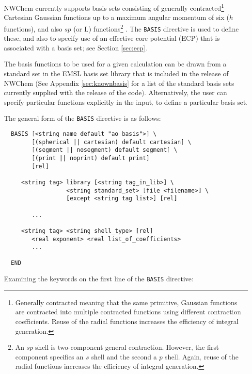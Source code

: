 %
%
\label{sec:basis} 

NWChem currently supports basis sets consisting of generally
contracted\footnote{Generally contracted meaning that the same
  primitive, Gaussian functions are contracted into multiple
  contracted functions using different contraction coefficients.
  Reuse of the radial functions increases the efficiency of integral
  generation.} Cartesian Gaussian functions up to a maximum angular
momentum of six ($h$ functions), and also $sp$ (or L)
functions\footnote{An $sp$ shell is two-component general contraction.
  However, the first component specifies an $s$ shell and the second a
  $p$ shell.  Again, reuse of the radial functions increases the efficiency
  of integral generation.} .  The {\tt BASIS} directive is used to
define these, and also to specify use of an effective core potential
(ECP) that is associated with a basis set; see Section \ref{sec:ecp}.

The basis functions to be used for a given calculation can be drawn
from a standard set in the EMSL basis set library that is included in
the release of NWChem  (See Appendix \ref{sec:knownbasis} for a list
of the standard basis sets currently supplied with the release of the
code).  Alternatively, the user can specify particular functions
explicitly in the input, to define a particular basis set.

The general form of the \verb+BASIS+ directive is as follows:

\begin{verbatim}
  BASIS [<string name default "ao basis">] \
        [(spherical || cartesian) default cartesian] \
        [(segment || nosegment) default segment] \
        [(print || noprint) default print]
        [rel]

     <string tag> library [<string tag_in_lib>] \
                  <string standard_set> [file <filename>] \
                  [except <string tag list>] [rel]

        ...

     <string tag> <string shell_type> [rel]
        <real exponent> <real list_of_coefficients>
        ...
     
  END
\end{verbatim}    

Examining the keywords on the first line of the \verb+BASIS+ directive:



